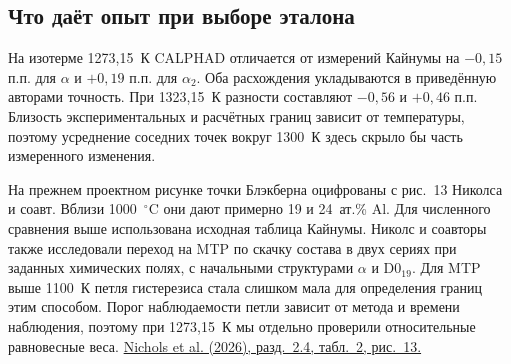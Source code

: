\subsection*{Что даёт опыт при выборе эталона}
На изотерме 1273,15~К CALPHAD отличается от измерений Кайнумы на
\(-0{,}15\) п.п. для \(\alpha\) и \(+0{,}19\) п.п. для \(\alpha_2\).
Оба расхождения укладываются в приведённую авторами точность.
При 1323,15~К разности составляют \(-0{,}56\) и \(+0{,}46\) п.п.
Близость экспериментальных и расчётных границ зависит от температуры,
поэтому усреднение соседних точек вокруг 1300~К здесь скрыло бы часть
измеренного изменения.

На прежнем проектном рисунке точки Блэкберна оцифрованы с
рис.~13 Николса и соавт. Вблизи 1000~\(^\circ\)C они дают примерно
19 и 24~ат.\% Al. Для численного сравнения выше использована исходная
таблица Кайнумы. Николс и соавторы также исследовали переход на MTP
по скачку состава в двух сериях при заданных химических полях,
с начальными структурами \(\alpha\) и D0$_{19}$. Для MTP выше
1100~К петля гистерезиса стала слишком мала для определения границ
этим способом. Порог наблюдаемости петли зависит от метода и времени
наблюдения, поэтому при 1273,15~К мы отдельно проверили относительные
равновесные веса.
\href{https://doi.org/10.3390/met16020140}{Nichols et al. (2026), разд.~2.4, табл.~2, рис.~13.}
